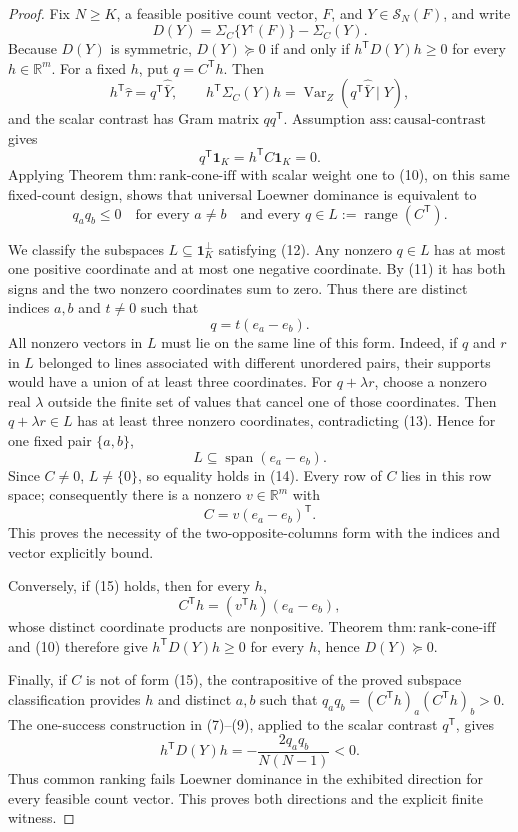 \documentclass{article}
\begin{document}
\begin{proof}
Fix \(N\geq K\), a feasible positive count vector, \(F\), and \(Y\in\mathcal S_N(F)\), and write
\[
D(Y)=\Sigma_C\{Y^{\uparrow}(F)\}-\Sigma_C(Y).
\]
Because \(D(Y)\) is symmetric, \(D(Y)\succeq0\) if and only if \(h^{\mathsf T}D(Y)h\geq0\) for every \(h\in\mathbb R^m\).  For a fixed \(h\), put \(q=C^{\mathsf T}h\).  Then
\[
h^{\mathsf T}\widehat\tau=q^{\mathsf T}\widehat{\bar Y},
\qquad
h^{\mathsf T}\Sigma_C(Y)h
=\operatorname{Var}_Z(q^{\mathsf T}\widehat{\bar Y}\mid Y), \tag{10}
\]
and the scalar contrast has Gram matrix \(qq^{\mathsf T}\).  Assumption \(\mathrm{ass{:}causal\text{-}contrast}\) gives
\[
q^{\mathsf T}\mathbf 1_K=h^{\mathsf T}C\mathbf 1_K=0. \tag{11}
\]
Applying Theorem \(\mathrm{thm{:}rank\text{-}cone\text{-}iff}\) with scalar weight one to (10), on this same fixed-count design, shows that universal Loewner dominance is equivalent to
\[
q_aq_b\leq0
\quad\text{for every }a\ne b
\quad\text{and every }q\in L:=\operatorname{range}(C^{\mathsf T}). \tag{12}
\]

We classify the subspaces \(L\subseteq\mathbf 1_K^{\perp}\) satisfying (12).  Any nonzero \(q\in L\) has at most one positive coordinate and at most one negative coordinate.  By (11) it has both signs and the two nonzero coordinates sum to zero.  Thus there are distinct indices \(a,b\) and \(t\ne0\) such that
\[
q=t(e_a-e_b). \tag{13}
\]
All nonzero vectors in \(L\) must lie on the same line of this form.  Indeed, if \(q\) and \(r\) in \(L\) belonged to lines associated with different unordered pairs, their supports would have a union of at least three coordinates.  For \(q+\lambda r\), choose a nonzero real \(\lambda\) outside the finite set of values that cancel one of those coordinates.  Then \(q+\lambda r\in L\) has at least three nonzero coordinates, contradicting (13).  Hence for one fixed pair \(\{a,b\}\),
\[
L\subseteq\operatorname{span}(e_a-e_b). \tag{14}
\]
Since \(C\ne0\), \(L\ne\{0\}\), so equality holds in (14).  Every row of \(C\) lies in this row space; consequently there is a nonzero \(v\in\mathbb R^m\) with
\[
C=v(e_a-e_b)^{\mathsf T}. \tag{15}
\]
This proves the necessity of the two-opposite-columns form with the indices and vector explicitly bound.

Conversely, if (15) holds, then for every \(h\),
\[
C^{\mathsf T}h=(v^{\mathsf T}h)(e_a-e_b),
\]
whose distinct coordinate products are nonpositive.  Theorem \(\mathrm{thm{:}rank\text{-}cone\text{-}iff}\) and (10) therefore give \(h^{\mathsf T}D(Y)h\geq0\) for every \(h\), hence \(D(Y)\succeq0\).

Finally, if \(C\) is not of form (15), the contrapositive of the proved subspace classification provides \(h\) and distinct \(a,b\) such that \(q_aq_b=(C^{\mathsf T}h)_a(C^{\mathsf T}h)_b>0\).  The one-success construction in (7)--(9), applied to the scalar contrast \(q^{\mathsf T}\), gives
\[
h^{\mathsf T}D(Y)h=-\frac{2q_aq_b}{N(N-1)}<0. \tag{16}
\]
Thus common ranking fails Loewner dominance in the exhibited direction for every feasible count vector.  This proves both directions and the explicit finite witness.
\end{proof}
\end{document}
